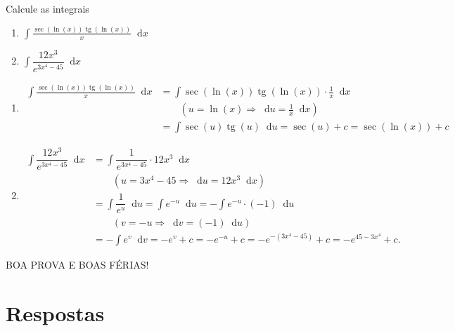 \documentclass[12pt,a4paper]{article}
\newcommand*\diff{\mathop{}\!\mathrm{d}}
\newcommand*\tg{\operatorname{tg}}
\begin{document}
\begin{ExerciseList}
\Exercise[title={2,0}] Calcule as integrais
\begin{multicols}{2}
    \begin{enumerate}
        \item $\displaystyle\int \frac{\sec(\ln(x))\tg(\ln(x))}{x} \diff{x}$
        \item $\displaystyle\int \dfrac{12x^3}{e^{3x^4 - 45}} \diff{x}$
    \end{enumerate}
\end{multicols}
\Answer
\begin{enumerate}
    \item
    \begin{align*}
        \int \frac{\sec(\ln(x))\tg(\ln(x))}{x} \diff{x}
        & = \int \sec(\ln(x))\tg(\ln(x)) \cdot \frac{1}{x} \diff{x} \\
        & \quad \quad (u = \ln(x)\Rightarrow \diff{u} = \frac{1}{x} \diff{x} ) \\
        & = \int \sec(u)\tg(u) \diff{u}
          = \sec(u) + c
          = \sec(\ln(x)) + c
    \end{align*}

    \item
    \begin{align*}
        \int \dfrac{12x^3}{e^{3x^4 - 45}} \diff{x}
        & = \int \dfrac{1}{e^{3x^4 - 45}} \cdot 12x^3 \diff{x} \\
        & \quad \quad (u = 3x^4 - 45 \Rightarrow \diff{u} = 12x^3 \diff{x} ) \\
        & = \int \dfrac{1}{e^{u}} \diff{u}
          = \int e^{-u} \diff{u}
          = -\int e^{-u} \cdot (-1) \diff{u} \\
        & \quad \quad (v = -u \Rightarrow \diff{v} = (-1) \diff{u} ) \\
        & = -\int e^{v} \diff{v}
          = -e^{v} + c
          = -e^{-u} + c
          = -e^{-(3x^4 - 45)} + c
          = -e^{45 - 3x^4} + c.
    \end{align*}
    \end{enumerate}
\end{ExerciseList}

\begin{center}
BOA PROVA E BOAS FÉRIAS!
\end{center}

\newpage
\restoregeometry
\section*{Respostas}
\shipoutAnswer
\end{document}
